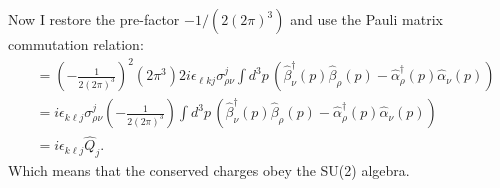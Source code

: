 Now I restore the pre-factor $-1/(2(2\pi)^3)$ and use the Pauli matrix commutation relation:
\begin{align*}
[\hat Q_k, \hat Q_\ell] &=
 \left(-\frac{1}{2(2\pi)^3}\right)^2 (2\pi^3) 2i \epsilon_{\ell k j} 
    \sigma^j_{\rho\nu} \int d^3 p \, \left( \hat{\beta}_\nu^\dagger (p) \hat{\beta}_\rho (p) - \hat{\alpha}_\rho^\dagger (p) \hat{\alpha}_\nu (p) \right) \\
    &= i \epsilon_{ k\ell j} \sigma^j_{\rho\nu} \left( -\frac{1}{2(2\pi)^3} \right) \int d^3 p \, \left( \hat{\beta}_\nu^\dagger (p) \hat{\beta}_\rho (p) - \hat{\alpha}_\rho^\dagger (p) \hat{\alpha}_\nu (p) \right)\\ 
    &= i \epsilon_{ k\ell j}  \hat Q_j.
\end{align*}
Which means that the conserved charges obey the SU(2) algebra.





